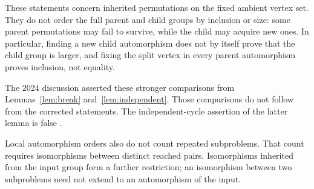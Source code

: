 These statements concern inherited permutations on the fixed ambient vertex
set. They do not order the full parent and child groups by inclusion or size:
some parent permutations may fail to survive, while the child may acquire new
ones. In particular, finding a new child automorphism does not by itself prove
that the child group is larger, and fixing the split vertex in every parent
automorphism proves inclusion, not equality.

The 2024 discussion asserted these stronger comparisons from
Lemmas~\ref{lem:break} and~\ref{lem:independent}. Those comparisons do not
follow from the corrected statements. The independent-cycle assertion of
the latter lemma is false .

Local automorphism orders also do not count repeated subproblems. That count
requires isomorphisms between distinct reached pairs. Isomorphisms inherited
from the input group form a further restriction; an isomorphism between two
subproblems need not extend to an automorphism of the input.
